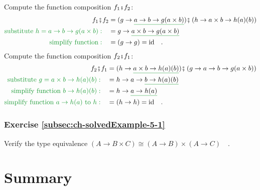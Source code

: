 Compute the function composition $f_{1}\bef f_{2}$:
\begin{align*}
f_{1}\bef f_{2} & =(g\rightarrow\gunderline{a\rightarrow b\rightarrow g(a\times b)})\bef\left(h\rightarrow a\times b\rightarrow h(a)(b)\right)\\
{\color{greenunder}\text{substitute }h=a\rightarrow b\rightarrow g(a\times b):}\quad & =g\rightarrow\gunderline{a\times b\rightarrow g(a\times b)}\\
{\color{greenunder}\text{simplify function}:}\quad & =\left(g\rightarrow g\right)=\text{id}\quad.
\end{align*}
Compute the function composition $f_{2}\bef f_{1}$:
\begin{align*}
f_{2}\bef f_{1} & =(h\rightarrow\gunderline{a\times b\rightarrow h(a)(b)})\bef\left(g\rightarrow a\rightarrow b\rightarrow g(a\times b)\right)\\
{\color{greenunder}\text{substitute }g=a\times b\rightarrow h(a)(b):}\quad & =h\rightarrow a\rightarrow\gunderline{b\rightarrow h(a)(b)}\\
{\color{greenunder}\text{simplify function }b\rightarrow h(a)(b):}\quad & =h\rightarrow\gunderline{a\rightarrow h(a)}\\
{\color{greenunder}\text{simplify function }a\rightarrow h(a)\text{ to }h:}\quad & =\left(h\rightarrow h\right)=\text{id}\quad.
\end{align*}


\subsubsection{Exercise \label{subsec:ch-solvedExample-5-1}\ref{subsec:ch-solvedExample-5-1}}

Verify the type equivalence $\left(A\rightarrow B\times C\right)\cong\left(A\rightarrow B\right)\times\left(A\rightarrow C\right)\quad.$

\section{Summary}

